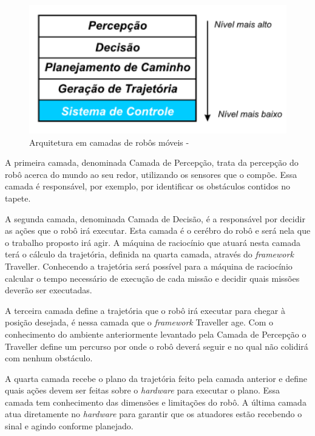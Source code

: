 \FloatBarrier
\begin{figure}[!h]
\centering
\includegraphics[keepaspectratio=true,scale=0.5]{figuras/arquiteturaCamadas.png}
\caption{Arquitetura em camadas de robôs móveis - }
\label{arquiteturaCamadas}
\end{figure}

A primeira camada, denominada Camada de Percepção, trata da percepção do robô acerca do mundo ao seu redor, utilizando os sensores que o compõe. Essa camada é responsável, por exemplo, por identificar os obstáculos contidos no tapete.

A segunda camada, denominada Camada de Decisão, é a responsável por decidir as ações que o robô irá executar. Esta camada é o cerébro do robô e será nela que o trabalho proposto irá agir. A máquina de raciocínio que atuará nesta camada terá o cálculo da trajetória, definida na 	quarta camada, através do \textit{framework} Traveller. Conhecendo a trajetória será possível para a máquina de raciocínio calcular o tempo necessário de execução de cada missão e decidir quais missões deverão ser executadas.

A terceira camada define a trajetória que o robô irá executar para chegar à posição desejada, é nessa camada que o \textit{framework} Traveller age. Com o conhecimento do ambiente anteriormente levantado pela Camada de Percepção o Traveller define um percurso por onde o robô deverá seguir e no qual não colidirá com nenhum obstáculo.

A quarta camada recebe o plano da trajetória feito pela camada anterior e define quais ações devem ser feitas sobre o \textit{hardware} para executar o plano. Essa camada tem conhecimento das dimensões e limitações do robô. A última camada atua diretamente no \textit{hardware} para garantir que os atuadores estão recebendo o sinal e agindo conforme planejado.
 
